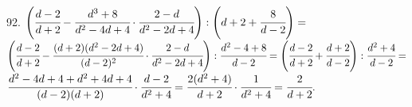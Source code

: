 92. $\left(\cfrac{d-2}{d+2}-\cfrac{d^3+8}{d^2-4d+4}\cdot\cfrac{2-d}{d^2-2d+4}\right):\left(d+2+\cfrac{8}{d-2}\right)=$\\$
\left(\cfrac{d-2}{d+2}-\cfrac{(d+2)(d^2-2d+4)}{(d-2)^2}\cdot\cfrac{2-d}{d^2-2d+4}\right):\cfrac{d^2-4+8}{d-2}=
\left(\cfrac{d-2}{d+2}+\cfrac{d+2}{d-2}\right):\cfrac{d^2+4}{d-2}=$\\$
\cfrac{d^2-4d+4+d^2+4d+4}{(d-2)(d+2)}\cdot\cfrac{d-2}{d^2+4}=
\cfrac{2(d^2+4)}{d+2}\cdot\cfrac{1}{d^2+4}=\cfrac{2}{d+2}.$\\
